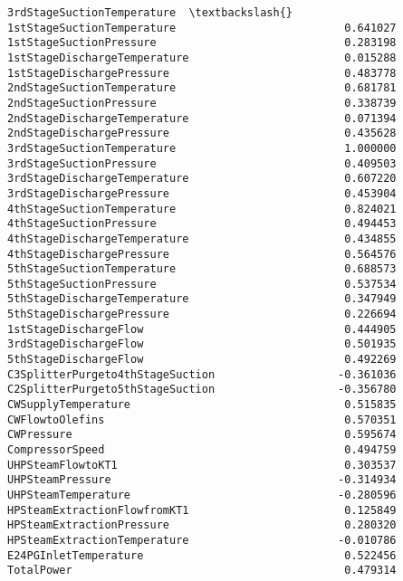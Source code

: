 \documentclass[11pt]{article}
\begin{document}
\begin{tcolorbox}[breakable, size=fbox, boxrule=.5pt, pad at break*=1mm, opacityfill=0]
\begin{Verbatim}[commandchars=\\\{\}]
                                  3rdStageSuctionTemperature  \textbackslash{}
1stStageSuctionTemperature                          0.641027
1stStageSuctionPressure                             0.283198
1stStageDischargeTemperature                        0.015288
1stStageDischargePressure                           0.483778
2ndStageSuctionTemperature                          0.681781
2ndStageSuctionPressure                             0.338739
2ndStageDischargeTemperature                        0.071394
2ndStageDischargePressure                           0.435628
3rdStageSuctionTemperature                          1.000000
3rdStageSuctionPressure                             0.409503
3rdStageDischargeTemperature                        0.607220
3rdStageDischargePressure                           0.453904
4thStageSuctionTemperature                          0.824021
4thStageSuctionPressure                             0.494453
4thStageDischargeTemperature                        0.434855
4thStageDischargePressure                           0.564576
5thStageSuctionTemperature                          0.688573
5thStageSuctionPressure                             0.537534
5thStageDischargeTemperature                        0.347949
5thStageDischargePressure                           0.226694
1stStageDischargeFlow                               0.444905
3rdStageDischargeFlow                               0.501935
5thStageDischargeFlow                               0.492269
C3SplitterPurgeto4thStageSuction                   -0.361036
C2SplitterPurgeto5thStageSuction                   -0.356780
CWSupplyTemperature                                 0.515835
CWFlowtoOlefins                                     0.570351
CWPressure                                          0.595674
CompressorSpeed                                     0.494759
UHPSteamFlowtoKT1                                   0.303537
UHPSteamPressure                                   -0.314934
UHPSteamTemperature                                -0.280596
HPSteamExtractionFlowfromKT1                        0.125849
HPSteamExtractionPressure                           0.280320
HPSteamExtractionTemperature                       -0.010786
E24PGInletTemperature                               0.522456
TotalPower                                          0.479314


\end{Verbatim}
\end{tcolorbox}
\end{document}
